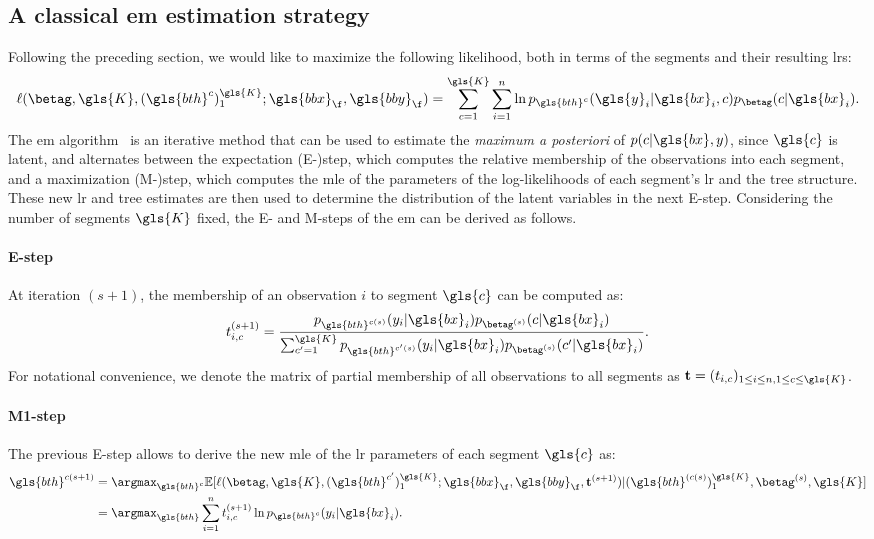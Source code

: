 \subsection{A classical \gls{em} estimation strategy}

Following the preceding section, we would like to maximize the following likelihood, both in terms of the segments and their resulting \gls{lr}s:
\[ \ell(\betag,\gls{K},(\gls{bth}^c)_1^{\gls{K}} ; \gls{bbx}_\f, \gls{bby}_\f) = \sum_{c=1}^{\gls{K}} \sum_{i=1}^n \ln p_{\gls{bth}^c}(\gls{y}_i | \gls{bx}_i, c) p_{\betag}(c | \gls{bx}_i).\]
The \gls{em} algorithm~\cite{dempster1977maximum} is an iterative method that can be used to estimate the \textit{maximum a posteriori} of $p(c | \gls{bx}, y)$, since $\gls{c}$ is latent, and alternates between the expectation (E-)step, which computes the relative membership of the observations into each segment, and a maximization (M-)step, which computes the \gls{mle} of the parameters of the log-likelihoods of each segment's \gls{lr} and the tree structure. These new \gls{lr} and tree estimates are then used to determine the distribution of the latent variables in the next E-step. Considering the number of segments $\gls{K}$ fixed, the E- and M-steps of the \gls{em} can be derived as follows.

\paragraph{E-step}
At iteration $(s+1)$, the membership of an observation $i$ to segment $\gls{c}$ can be computed as:
\[ t_{i,c}^{(s+1)} = \frac{p_{\gls{bth}^{c(s)}}(y_i | \gls{bx}_i) p_{\betag^{(s)}}(c | \gls{bx}_i) }{ \sum_{c'=1}^{\gls{K}} p_{\gls{bth}^{c{'}{(s)}}}(y_i | \gls{bx}_i) p_{\betag^{(s)}}(c{'} | \gls{bx}_i) }.\]
For notational convenience, we denote the matrix of partial membership of all observations to all segments as $\mathbf{t} = (t_{i,c})_{1\leq i \leq n, 1 \leq c \leq \gls{K}}$.

\paragraph{M1-step}
The previous E-step allows to derive the new \gls{mle} of the \gls{lr} parameters of each segment $\gls{c}$ as:
\begin{align*}
\gls{bth}^{c(s+1)} & = \argmax_{\gls{bth}^c} \mathbb{E}[\ell(\betag, \gls{K}, (\gls{bth}^{c{'}})_1^{\gls{K}}; \gls{bbx}_{\f}, \gls{bby}_{\f}, \mathbf{t}^{(s+1)}) | (\gls{bth}^{(c(s)})_1^{\gls{K}}, \betag^{(s)}, \gls{K}] \\
& = \argmax_{\gls{bth}} \sum_{i=1}^n t_{i,c}^{(s+1)} \ln p_{\gls{bth}^c}(y_i | \gls{bx}_i).
\end{align*}

